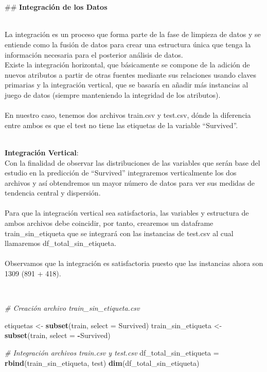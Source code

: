 \documentclass[
]{article}
\newenvironment{Shaded}{\begin{snugshade}}{\end{snugshade}}
\newcommand{\CommentTok}[1]{\textcolor[rgb]{0.56,0.35,0.01}{\textit{#1}}}
\newcommand{\DataTypeTok}[1]{\textcolor[rgb]{0.13,0.29,0.53}{#1}}
\newcommand{\KeywordTok}[1]{\textcolor[rgb]{0.13,0.29,0.53}{\textbf{#1}}}
\newcommand{\NormalTok}[1]{#1}
\newcommand{\OperatorTok}[1]{\textcolor[rgb]{0.81,0.36,0.00}{\textbf{#1}}}
\newcommand{\StringTok}[1]{\textcolor[rgb]{0.31,0.60,0.02}{#1}}
\begin{document}
\texttt{}\\
\texttt{}~\\
\#\# \textbf{Integración de los Datos}

\texttt{}\\
La integración es un proceso que forma parte de la fase de limpieza de
datos y se entiende como la fusión de datos para crear una estructura
única que tenga la información necesaria para el posterior análisis de
datos. \texttt{}\\
Existe la integración horizontal, que básicamente se compone de la
adición de nuevos atributos a partir de otras fuentes mediante sus
relaciones usando claves primarias y la integración vertical, que se
basaría en añadir más instancias al juego de datos (siempre manteniendo
la integridad de los atributos).\\
\texttt{}~\\
En nuestro caso, tenemos dos archivos train.csv y test.csv, dónde la
diferencia entre ambos es que el test no tiene las etiquetas de la
variable ``Survived''.

\texttt{}\\
\textbf{Integración Vertical}: \texttt{}\\
Con la finalidad de observar las distribuciones de las variables que
serán base del estudio en la predicción de ``Survived'' integraremos
verticalmente los dos archivos y así obtendremos un mayor número de
datos para ver sus medidas de tendencia central y dispersión.\\
\texttt{}~\\
Para que la integración vertical sea satisfactoria, las variables y
estructura de ambos archivos debe coincidir, por tanto, crearemos un
dataframe train\_sin\_etiqueta que se integrará con las instancias de
test.csv al cual llamaremos df\_total\_sin\_etiqueta.\\
\texttt{}~\\
Observamos que la integración es satisfactoria puesto que las instancias
ahora son 1309 (891 + 418).

\texttt{}\\
\texttt{}

\begin{Shaded}
\begin{Highlighting}[]
\CommentTok{# Creación archivo train_sin_etiqueta.csv}

\NormalTok{etiquetas <-}\StringTok{ }\KeywordTok{subset}\NormalTok{(train, }\DataTypeTok{select =}\NormalTok{ Survived)}
\NormalTok{train_sin_etiqueta <-}\StringTok{ }\KeywordTok{subset}\NormalTok{(train, }\DataTypeTok{select =} \OperatorTok{-}\NormalTok{Survived)}

\CommentTok{# Integración archivos train.csv y test.csv}
\NormalTok{df_total_sin_etiqueta =}\StringTok{ }\KeywordTok{rbind}\NormalTok{(train_sin_etiqueta, test)}
\KeywordTok{dim}\NormalTok{(df_total_sin_etiqueta)}
\end{Highlighting}
\end{Shaded}
\end{document}
